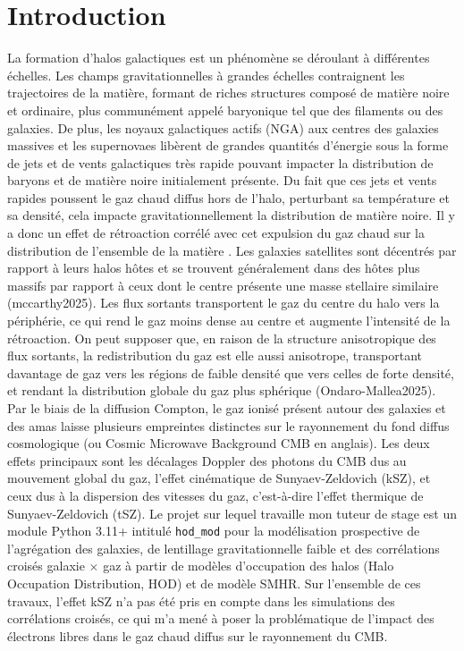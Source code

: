 \documentclass[a4paper, french, twoside, twocolumn, 11 pt]{article}
\begin{document}
\section{Introduction}
La formation d'halos galactiques est un phénomène se déroulant à différentes échelles. Les champs gravitationnelles à grandes échelles contraignent les trajectoires de la matière, formant de riches structures composé de matière noire et ordinaire, plus communément appelé baryonique tel que des filaments ou des galaxies. De plus, les noyaux galactiques actifs (NGA) aux centres des galaxies massives et les supernovaes libèrent de grandes quantités d'énergie sous la forme de jets et de vents galactiques très rapide pouvant impacter la distribution de baryons et de matière noire initialement présente. Du fait que ces jets et vents rapides poussent le gaz chaud diffus hors de l'halo, perturbant sa température et sa densité, cela impacte gravitationnellement la distribution de matière noire. Il y a donc un effet de rétroaction corrélé avec cet expulsion du gaz chaud sur la distribution de l'ensemble de la matière \cite{pandey2024godmaxmodelinggasthermodynamics}. Les galaxies satellites sont décentrés par rapport à leurs halos hôtes et se trouvent généralement dans des hôtes plus massifs par rapport à ceux dont le centre présente une masse stellaire similaire (mccarthy2025). Les flux sortants transportent le gaz du centre du halo vers la périphérie, ce qui rend le gaz moins dense au centre et augmente l'intensité de la rétroaction. On peut supposer que, en raison de la structure anisotropique des flux sortants, la redistribution du gaz est elle aussi anisotrope, transportant davantage de gaz vers les régions de faible densité que vers celles de forte densité, et rendant la distribution globale du gaz plus sphérique (Ondaro-Mallea2025). Par le biais de la diffusion Compton, le gaz ionisé présent autour des galaxies et des amas laisse plusieurs empreintes distinctes sur le rayonnement du fond diffus cosmologique (ou Cosmic Microwave Background CMB en anglais). Les deux effets principaux sont les décalages Doppler des photons du CMB dus au mouvement global du gaz, l'effet cinématique de Sunyaev-Zeldovich (kSZ), et ceux dus à la dispersion des vitesses du gaz, c'est-à-dire l'effet thermique de Sunyaev-Zeldovich (tSZ).
Le projet sur lequel travaille mon tuteur de stage est un module Python 3.11+ intitulé \verb|hod_mod| pour la modélisation prospective de l'agrégation des galaxies, de lentillage gravitationnelle faible et des corrélations croisés galaxie $\times$ gaz à partir de modèles d'occupation des halos (Halo Occupation Distribution, HOD) et de modèle SMHR. Sur l'ensemble de ces travaux, l'effet kSZ n'a pas été pris en compte dans les simulations des corrélations croisés, ce qui m'a mené à poser la problématique de l'impact des électrons libres dans le gaz chaud diffus sur le rayonnement du CMB.
\end{document}
